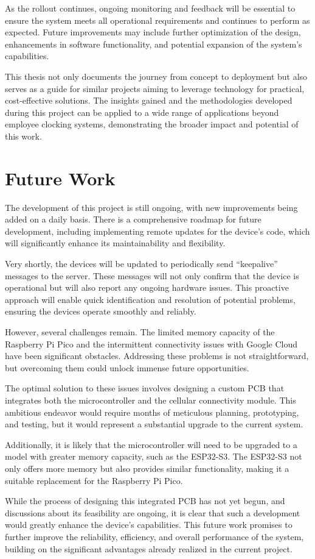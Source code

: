As the rollout continues, ongoing monitoring and feedback will be essential to ensure the system 
meets all operational requirements and continues to perform as expected. Future improvements may 
include further optimization of the design, enhancements in software functionality, and potential 
expansion of the system's capabilities.

This thesis not only documents the journey from concept to deployment but also serves as a guide 
for similar projects aiming to leverage technology for practical, cost-effective solutions. The 
insights gained and the methodologies developed during this project can be applied to a wide range 
of applications beyond employee clocking systems, demonstrating the broader impact and potential 
of this work.


\section{Future Work}

The development of this project is still ongoing, with new improvements being added on a daily 
basis. There is a comprehensive roadmap for future development, including implementing remote 
updates for the device's code, which will significantly enhance its maintainability and 
flexibility.

Very shortly, the devices will be updated to periodically send ``keepalive'' messages to the server. 
These messages will not only confirm that the device is operational but will also report any 
ongoing hardware issues. This proactive approach will enable quick identification and resolution 
of potential problems, ensuring the devices operate smoothly and reliably.

However, several challenges remain. The limited memory capacity of the Raspberry Pi Pico and the 
intermittent connectivity issues with Google Cloud have been significant obstacles. Addressing 
these problems is not straightforward, but overcoming them could unlock immense future 
opportunities.

The optimal solution to these issues involves designing a custom PCB that integrates both the 
microcontroller and the cellular connectivity module. This ambitious endeavor would require months 
of meticulous planning, prototyping, and testing, but it would represent a substantial upgrade to 
the current system.

Additionally, it is likely that the microcontroller will need to be upgraded to a model with 
greater memory capacity, such as the ESP32-S3. The ESP32-S3 not only offers more memory but also 
provides similar functionality, making it a suitable replacement for the Raspberry Pi Pico.

While the process of designing this integrated PCB has not yet begun, and discussions about its 
feasibility are ongoing, it is clear that such a development would greatly enhance the device's 
capabilities. This future work promises to further improve the reliability, efficiency, and 
overall performance of the system, building on the significant advantages already realized in the 
current project.
